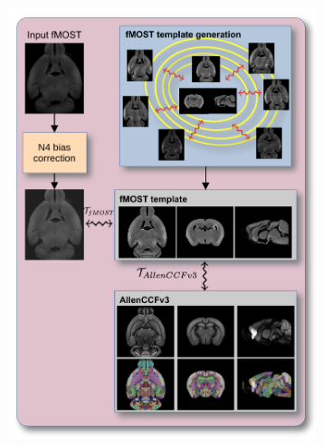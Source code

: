 \documentclass[
  12pt,
]{article}
\begin{document}
\begin{figure}
\centering
\begin{subfigure}[t]{0.49\textwidth}
\centering
\includegraphics[width=0.99\textwidth]{Figures/fmostPipeline.pdf}
\caption{}
\end{subfigure} 
\begin{subfigure}[t]{0.49\textwidth}
\centering

\end{subfigure}
\end{figure}
\end{document}
